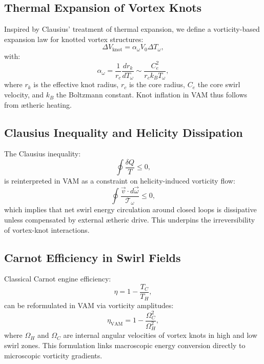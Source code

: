 \subsection*{Thermal Expansion of Vortex Knots}

Inspired by Clausius' treatment of thermal expansion, we define a vorticity-based expansion law for knotted vortex structures:
\begin{equation}
    \Delta V_\text{knot} = \alpha_\omega V_0 \Delta T_\omega,
\end{equation}
with:
\begin{equation}
    \alpha_\omega = \frac{1}{r_c} \frac{d r_k}{d T_\omega} \sim \frac{C_e^2}{r_c k_B T_\omega},
\end{equation}
where $r_k$ is the effective knot radius, $r_c$ is the core radius, $C_e$ the core swirl velocity, and $k_B$ the Boltzmann constant. Knot inflation in VAM thus follows from ætheric heating.

\subsection*{Clausius Inequality and Helicity Dissipation}

The Clausius inequality:
\begin{equation}
    \oint \frac{\delta Q}{T} \leq 0,
\end{equation}
is reinterpreted in VAM as a constraint on helicity-induced vorticity flow:
\begin{equation}
    \oint \frac{\vec{v} \cdot d\vec{\omega}}{\mathcal{T}_\omega} \leq 0,
\end{equation}
which implies that net swirl energy circulation around closed loops is dissipative unless compensated by external ætheric drive. This underpins the irreversibility of vortex-knot interactions.

\subsection*{Carnot Efficiency in Swirl Fields}

Classical Carnot engine efficiency:
\begin{equation}
    \eta = 1 - \frac{T_C}{T_H},
\end{equation}
can be reformulated in VAM via vorticity amplitudes:
\begin{equation}
    \eta_\text{VAM} = 1 - \frac{\Omega_C^2}{\Omega_H^2},
\end{equation}
where $\Omega_H$ and $\Omega_C$ are internal angular velocities of vortex knots in high and low swirl zones. This formulation links macroscopic energy conversion directly to microscopic vorticity gradients.

